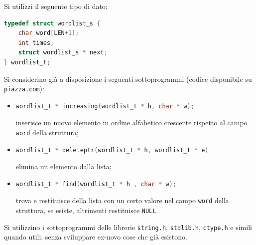 Si utilizzi il seguente tipo di dato:
\begin{lstlisting}[language=C,numbers=none]
typedef struct wordlist_s {
	char word[LEN+1];
	int times;
	struct wordlist_s * next;
} wordlist_t;
\end{lstlisting}

Si considerino gi\`a a disposizione i seguenti sottoprogrammi (codice disponibile su \texttt{piazza.com}):

\begin{itemize}
\item 
\begin{lstlisting}[language=C]
wordlist_t * increasing(wordlist_t * h, char * w);
\end{lstlisting} 
inserisce un nuovo elemento in ordine alfabetico crescente rispetto al campo \texttt{word} della struttura;
\item
\begin{lstlisting}[language=C]
wordlist_t * deleteptr(wordlist_t * h, wordlist_t * e)
\end{lstlisting} 
elimina un elemento dalla lista;
\item 
\begin{lstlisting}[language=C]
wordlist_t * find(wordlist_t * h , char * w);
\end{lstlisting} 
 trova e restituisce della lista con un certo valore nel campo \texttt{word} della struttura, se esiste, altrimenti restituisce \texttt{NULL}.
\end{itemize}

Si utilizzino i sottoprogrammi delle librerie \texttt{string.h}, \texttt{stdlib.h}, \texttt{ctype.h} e simili quando utili, senza sviluppare ex-novo cose che gi\`a esistono.





